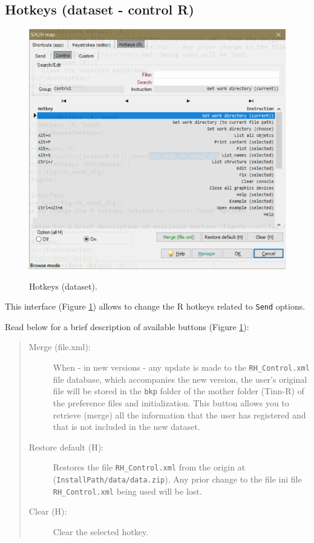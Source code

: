 \subsection{Hotkeys (dataset - control R)}

\begin{figure}[H]
  \includegraphics[scale=0.35]{./res/dlg_skh_map_rh_control.png}\\
  \caption{Hotkeys (dataset).}
  \label{fig:rh_control_dlg}
\end{figure}

This interface
(Figure \ref{fig:rh_control_dlg})
allows to change the R hotkeys related to \texttt{Send} options.

Read below for a brief description of available buttons (Figure \ref{fig:rh_control_dlg}):

\begin{quote}
  \begin{footnotesize}
    \begin{description}
      \item[Merge (file.xml):]
        When - in new versions - any update is made to the \texttt{RH\_Control.xml} file database,
        which accompanies the new version, the user's original file will be stored in
        the \texttt{bkp} folder of the mother folder (Tinn-R) of the preference files and initialization.
        This button allows you to retrieve (merge) all the information that the user has registered
        and that is not included in the new dataset.
      \item[Restore default (H):]
        Restores the file \texttt{RH\_Control.xml} from the origin at
        (\texttt{InstallPath/data/data.zip}). Any prior change to the file ini file
        \texttt{RH\_Control.xml} being used will be lost.
      \item[Clear (H):]
        Clear the selected hotkey.
    \end{description}
  \end{footnotesize}
\end{quote}


